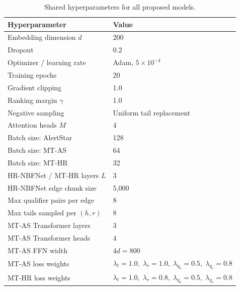 \documentclass[10pt,journal,compsoc]{IEEEtran}
\begin{document}
\begin{table}[t]
\centering
\caption{Shared hyperparameters for all proposed models.}
\label{tab:hyperparams}
\renewcommand{\arraystretch}{1.2}
\begin{tabular}{ll}
\toprule
\textbf{Hyperparameter} & \textbf{Value} \\
\midrule
Embedding dimension $d$          & 200 \\
Dropout                          & 0.2 \\
Optimizer / learning rate        & Adam, $5\times10^{-4}$ \\
Training epochs                  & 20 \\
Gradient clipping                & 1.0 \\
Ranking margin $\gamma$          & 1.0 \\
Negative sampling                & Uniform tail replacement \\
Attention heads $M$              & 4 \\
\midrule
Batch size: AlertStar            & 128 \\
Batch size: MT-AS                & 64 \\
Batch size: MT-HR                & 32 \\
\midrule
HR-NBFNet / MT-HR layers $L$     & 3 \\
HR-NBFNet edge chunk size        & 5{,}000 \\
Max qualifier pairs per edge     & 8 \\
Max tails sampled per $(h,r)$    & 8 \\
\midrule
MT-AS Transformer layers         & 3 \\
MT-AS Transformer heads          & 4 \\
MT-AS FFN width                  & $4d = 800$ \\
\midrule
MT-AS loss weights               & $\lambda_t{=}1.0,\;
                                    \lambda_r{=}1.0,\;
                                    \lambda_{q_k}{=}0.5,\;
                                    \lambda_{q_v}{=}0.8$ \\
MT-HR loss weights               & $\lambda_t{=}1.0,\;
                                    \lambda_r{=}0.8,\;
                                    \lambda_{q_k}{=}0.5,\;
                                    \lambda_{q_v}{=}0.8$ \\
\bottomrule
\end{tabular}
\end{table}

\end{document}
